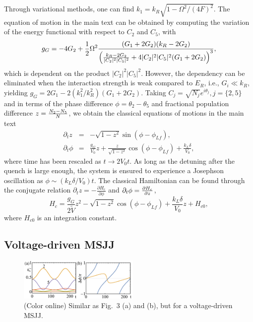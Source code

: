 \documentclass[twocolumn,prl,floatfix,citeautoscript,nofootinbib,superscriptaddress]{revtex4}
\begin{document}
Through variational methods, one can find $k_{1}=k_{R}\sqrt{1-\Omega
^{2}/(4F)^{2}}$. The equation of motion in the main text can be obtained by
computing the variation of the energy functional with respect to $C_{2}$ and
$C_{5}$, with
\begin{equation*}
g_{G}=-4G_{2}+\frac{1}{2}\Omega ^{2}\frac{(G_{1}+2G_{2})(k_{R}-2G_{2})}{%
\left( \frac{k_{R}-2G_{2}}{|C_{2}|^{2}|C_{5}|^{2}}%
+4|C_{2}|^{2}|C_{5}|^{2}(G_{1}+2G_{2})\right) ^{3}},
\end{equation*}%
which is dependent on the product $|C_{2}|^{2}|C_{5}|^{2}$. However, the
dependency can be eliminated when the interaction strength is weak compared
to $E_{R}$, i.e., $G_{i}\ll k_{R}$, yielding $%
g_{G}=2G_{1}-2(k_{1}^{2}/k_{R}^{2})(G_{1}+2G_{2})$. Taking $C_{j}=\sqrt{N_{j}%
}e^{i\theta _{j}},j=\{2,5\}$ and in terms of the phase difference $\phi
=\theta _{2}-\theta _{5}$ and fractional population difference $z=\frac{%
N_{2}-N_{5}}{N}$, we obtain the classical equations of motions in the main
text
\begin{eqnarray*}
\partial _{t}z &=&-\sqrt{1-z^{2}}\sin \left( \phi -\phi _{Lf}\right) , \\
\partial _{t}\phi &=&\frac{g_{G}}{V_{0}}z+\frac{z}{\sqrt{1-z^{2}}}\cos
\left( \phi -\phi _{Lf}\right) +\frac{k_{L}\delta }{V_{0}},
\end{eqnarray*}%
where time has been rescaled as $t\rightarrow 2V_{0}t$. As long as the
detuning after the quench is large enough, the system is ensured to
experience a Josephson oscillation as $\phi \sim (k_{L}\delta /V_{0})t$. The
classical Hamiltonian can be found through the conjugate relation $\partial
_{t}z=-\frac{\partial H_{c}}{\partial \phi }$ and $\partial _{t}\phi =\frac{%
\partial H_{c}}{\partial z}$,
\begin{equation*}
H_{c}=\frac{g_{G}}{2\tilde{V}}z^{2}-\sqrt{1-z^{2}}\cos \left( \phi -\phi
_{Lf}\right) +\frac{k_{L}\delta }{V_{0}}z+H_{c0},
\end{equation*}%
where $H_{c0}$ is an integration constant.

\subsection{Voltage-driven MSJJ}

\begin{figure}[t]
\centering
\includegraphics[width=0.52\textwidth]{FigS2.pdf}
\caption{(Color online) Similar as Fig.~3 (a) and (b), but for a
voltage-driven MSJJ.}
\label{figs2}
\end{figure}
\end{document}
